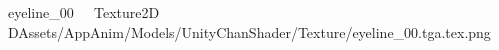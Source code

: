 
   eyeline_00            	   Texture2D
   D   Assets/AppAnim/Models/UnityChanShader/Texture/eyeline_00.tga.tex.png